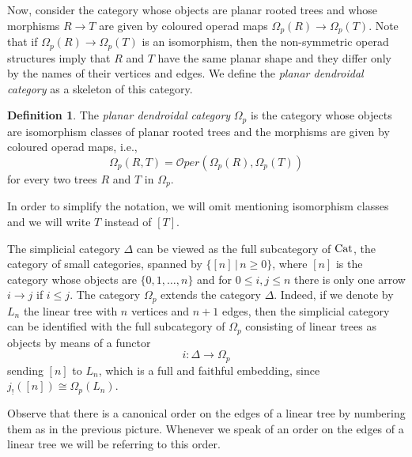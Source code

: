 \documentclass[a4paper]{amsart}
\theoremstyle{plain}
\theoremstyle{definition}
\newtheorem{dfn}[thm]{Definition}
\theoremstyle{remark}
\newcommand{\rpd}{\Omega_p}
\newcommand{\To}{\longrightarrow}
\newcommand{\Oper}{\mathcal{O}per}
\numberwithin{equation}{section}
\numberwithin{figure}{section}
\begin{document}
Now, consider the category whose objects are planar rooted trees and whose morphisms $R\To T$ are given by coloured
operad maps $\Omega_p(R)\To\Omega_p(T)$. Note that if $\Omega_p(R)\longrightarrow \Omega_p(T)$ is an isomorphism, then the
non-symmetric operad structures imply that $R$ and $T$ have the same planar shape and they differ only by the names of
their vertices and edges. We define the \textit{planar dendroidal category} as a skeleton of this category.

\begin{dfn}
    The \emph{planar dendroidal category} $\rpd$ is the category whose objects are isomorphism classes of
    planar rooted trees and the morphisms are given by coloured operad maps, i.e.,
    $$
        \rpd(R,T)=\Oper(\Omega_p(R), \Omega_p(T))
    $$
    for every two trees $R$ and $T$ in $\rpd$.
\end{dfn}

In order to simplify the notation, we will omit mentioning
isomorphism classes and we will write $T$ instead of $[T]$.

The simplicial category $\Delta$ can be viewed as the full
subcategory of ${\rm Cat}$, the category of small categories,
spanned by $\{[n]\,|\, n\ge 0\}$, where $[n]$ is the category whose
objects are $\{0,1,\ldots, n\}$ and for $0\le i,j\le n$ there is
only one arrow $i\longrightarrow j$ if $i\le j$. The category
$\Omega_p$ extends the category $\Delta$. Indeed, if we denote by
$L_n$ the linear tree with $n$ vertices and $n+1$ edges,
then the simplicial category can be identified with the full subcategory of $\rpd$ consisting of linear trees as objects
by means of a functor
\begin{equation}
    i\colon \Delta\longrightarrow \Omega_p
    \label{embedding of delta}
\end{equation}
sending $[n]$ to $L_n$, which is a full and faithful embedding, since $j_!([n])\cong\Omega_p(L_n)$.

Observe that there is a canonical order on the edges of a linear tree by numbering them as in the previous picture. Whenever we speak of an order on the edges of a linear tree we will be referring to this order.
\end{document}
